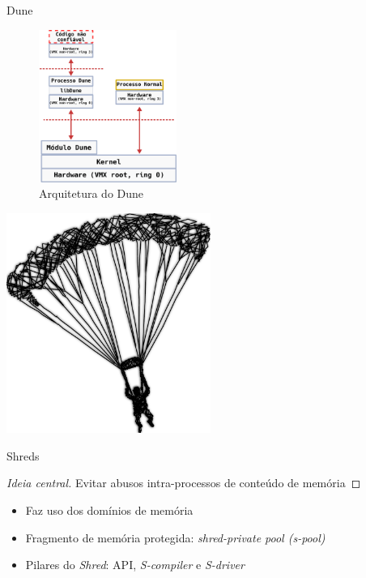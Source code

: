 \documentclass[xcolor={usenames,svgnames,dvipsnames},brazil,english,12pt,aspectratio=149]{beamer}
\begin{document}
\begin{frame}{Dune}
  \begin{figure}[!h]
    \centering
    \includegraphics[width=0.4\textwidth]{dune_architecture} 
    \caption[Arquitetura do Dune]{Arquitetura do Dune}
    \label{fig:dune_architecture}
  \end{figure}
\end{frame}

\begin{frame}[plain]
  \includegraphics[width=0.5\textwidth]{presentation_cap2_one}
\end{frame}

\begin{frame}{Shreds}

  \begin{proof}[Ideia central]
Evitar abusos intra-processos de conteúdo de memória
  \end{proof}

  \begin{itemize}
    \item Faz uso dos domínios de memória
    \item Fragmento de memória protegida: \emph{shred-private pool (s-pool)}
    \item Pilares do \emph{Shred}: API, \emph{S-compiler} e \emph{S-driver}
  \end{itemize}

\end{frame}
\end{document}
